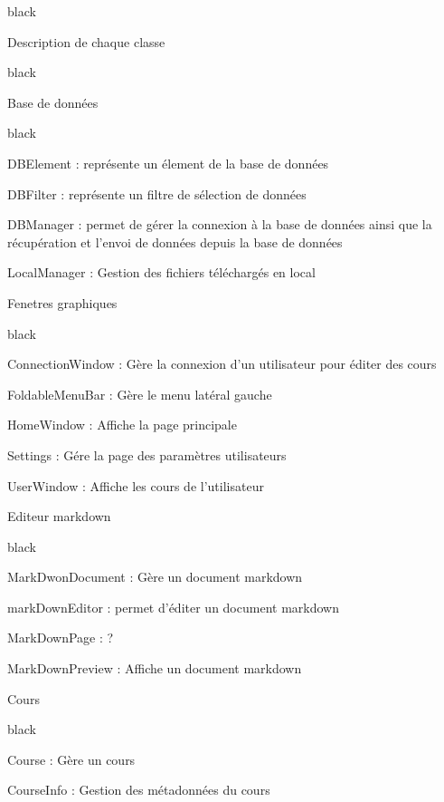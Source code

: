 {\begin{items}{black}{\Bullet}
\item Description de chaque classe

\begin{items}{black}{\Triangle}

\item Base de données

\begin{items}{black}{\Bullet}

\item DBElement : représente un élement de la base de données
\item DBFilter : représente un filtre de sélection de données
\item DBManager : permet de gérer la connexion à la base de données ainsi que la récupération et l'envoi de données depuis la base de données 
\item LocalManager : Gestion des fichiers téléchargés en local
\end{items}

\item Fenetres graphiques

\begin{items}{black}{\Bullet}

\item ConnectionWindow : Gère la connexion d'un utilisateur pour éditer des cours
\item FoldableMenuBar : Gère le menu latéral gauche
\item HomeWindow : Affiche la page principale
\item Settings : Gére la page des paramètres utilisateurs
\item UserWindow : Affiche les cours de l'utilisateur
\end{items}


\item Editeur markdown

\begin{items}{black}{\Bullet}
\item MarkDwonDocument : Gère un document markdown
\item markDownEditor : permet d'éditer un document markdown
\item MarkDownPage : ?
\item MarkDownPreview : Affiche un document markdown
\end{items}

\item Cours

\begin{items}{black}{\Bullet}
\item Course : Gère un cours
\item CourseInfo : Gestion des métadonnées du cours
\end{items}


\end{items}
\end{items}}
